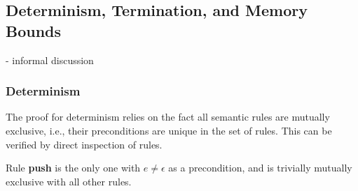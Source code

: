 
\subsection{Determinism, Termination, and Memory Bounds}

- informal discussion

\subsubsection*{Determinism}

The proof for determinism relies on the fact all semantic rules are mutually
exclusive, i.e., their preconditions are unique in the set of rules.
This can be verified by direct inspection of rules.

Rule \textbf{push} is the only one with $e \neq \epsilon$ as a precondition,
and is trivially mutually exclusive with all other rules.

